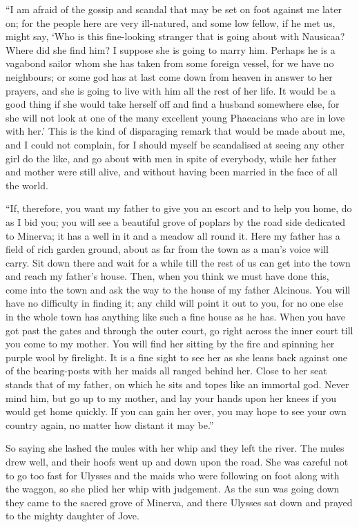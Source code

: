 “I am afraid of the gossip and scandal that may be set on foot against me later
on; for the people here are very ill-natured, and some low fellow, if he met
us, might say, ‘Who is this fine-looking stranger that is going about with
Nausicaa? Where did she find him? I suppose she is going to marry him. Perhaps
he is a vagabond sailor whom she has taken from some foreign vessel, for we
have no neighbours; or some god has at last come down from heaven in answer to
her prayers, and she is going to live with him all the rest of her life. It
would be a good thing if she would take herself off and find a husband
somewhere else, for she will not look at one of the many excellent young
Phaeacians who are in love with her.’ This is the kind of disparaging remark
that would be made about me, and I could not complain, for I should myself be
scandalised at seeing any other girl do the like, and go about with men in
spite of everybody, while her father and mother were still alive, and without
having been married in the face of all the world.

“If, therefore, you want my father to give you an escort and to help you home,
do as I bid you; you will see a beautiful grove of poplars by the road side
dedicated to Minerva; it has a well in it and a meadow all round it. Here my
father has a field of rich garden ground, about as far from the town as a man’s
voice will carry. Sit down there and wait for a while till the rest of us can
get into the town and reach my father’s house. Then, when you think we must
have done this, come into the town and ask the way to the house of my father
Alcinous. You will have no difficulty in finding it; any child will point it
out to you, for no one else in the whole town has anything like such a fine
house as he has. When you have got past the gates and through the outer court,
go right across the inner court till you come to my mother. You will find her
sitting by the fire and spinning her purple wool by firelight. It is a fine
sight to see her as she leans back against one of the bearing-posts with her
maids all ranged behind her. Close to her seat stands that of my father, on
which he sits and topes like an immortal god. Never mind him, but go up to my
mother, and lay your hands upon her knees if you would get home quickly. If you
can gain her over, you may hope to see your own country again, no matter how
distant it may be.”

So saying she lashed the mules with her whip and they left the river. The mules
drew well, and their hoofs went up and down upon the road. She was careful not
to go too fast for Ulysses and the maids who were following on foot along with
the waggon, so she plied her whip with judgement. As the sun was going down
they came to the sacred grove of Minerva, and there Ulysses sat down and prayed
to the mighty daughter of Jove.

